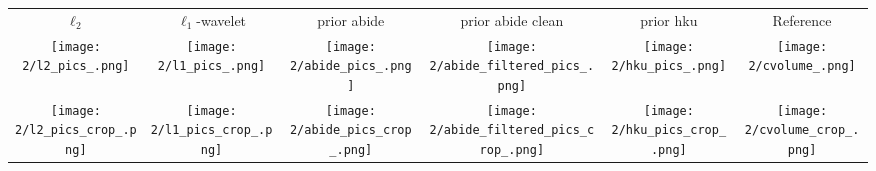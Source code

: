 \begin{tabular}{c @{\hskip 0pt} c @{\hskip 0pt} c @{\hskip 0pt} c @{\hskip 0pt} c @{\hskip 0pt} c}
    $\ell_2$& $\ell_1$-wavelet & prior abide & prior abide clean & prior hku & Reference\\
    \texttt{[image: 2/l2\_pics\_.png]}&
    \texttt{[image: 2/l1\_pics\_.png]}&
    \texttt{[image: 2/abide\_pics\_.png]}&
    \texttt{[image: 2/abide\_filtered\_pics\_.png]}&
    \texttt{[image: 2/hku\_pics\_.png]}&
    \texttt{[image: 2/cvolume\_.png]}\\
    \texttt{[image: 2/l2\_pics\_crop\_.png]}&
    \texttt{[image: 2/l1\_pics\_crop\_.png]}&
    \texttt{[image: 2/abide\_pics\_crop\_.png]}&
    \texttt{[image: 2/abide\_filtered\_pics\_crop\_.png]}&
    \texttt{[image: 2/hku\_pics\_crop\_.png]}&
    \texttt{[image: 2/cvolume\_crop\_.png]}
\end{tabular}